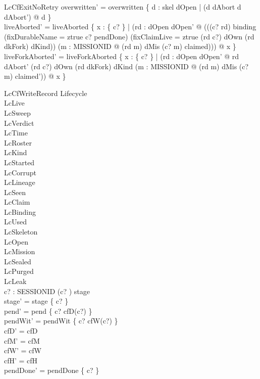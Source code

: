 \documentclass[a4paper,10pt,fleqn]{article}
\begin{document}
\begin{schema}{LcCfExitNoRetry}
overwritten' = overwritten \cup \{ d : skel \setminus dOpen | (d \in dAbort \iff d \notin dAbort') @ d \} \\
liveAborted' = liveAborted \cup \{ x : \{ c? \} | (\exists rd : dOpen \setminus dOpen' @ (((c? \mapsto rd) \in binding \lor (fixDurableName = ztrue \land c? \in pendDone) \lor (fixClaimLive = ztrue \land (rd \mapsto c?) \in dOwn \land (rd \mapsto dkFork) \in dKind)) \land (\exists m : MISSIONID @ (rd \mapsto m) \in dMis \land (c? \mapsto m) \in claimed))) @ x \} \\
liveForkAborted' = liveForkAborted \cup \{ x : \{ c? \} | (\exists rd : dOpen \setminus dOpen' @ rd \in dAbort' \land (rd \mapsto c?) \in dOwn \land (rd \mapsto dkFork) \in dKind \land (\exists m : MISSIONID @ (rd \mapsto m) \in dMis \land (c? \mapsto m) \in claimed')) @ x \}
\end{schema}

\begin{schema}{LcCfWriteRecord}
\Delta Lifecycle \\
\Xi LcLive \\
\Xi LcSweep \\
\Xi LcVerdict \\
\Xi LcTime \\
\Xi LcRoster \\
\Xi LcKind \\
\Xi LcStarted \\
\Xi LcCorrupt \\
\Xi LcLineage \\
\Xi LcSeen \\
\Xi LcClaim \\
\Xi LcBinding \\
\Xi LcUsed \\
\Xi LcSkeleton \\
\Xi LcOpen \\
\Xi LcMission \\
\Xi LcSealed \\
\Xi LcPurged \\
\Xi LcLeak \\
c? : SESSIONID
\where
(c? ) \in stage \\
stage' = stage \oplus \{ c?  \} \\
pend' = pend \oplus \{ c? \mapsto cfD(c?) \} \\
pendWit' = pendWit \oplus \{ c? \mapsto cfW(c?) \} \\
cfD' = cfD \\
cfM' = cfM \\
cfW' = cfW \\
cfH' = cfH \\
pendDone' = pendDone \setminus \{ c? \}
\end{schema}
\end{document}
